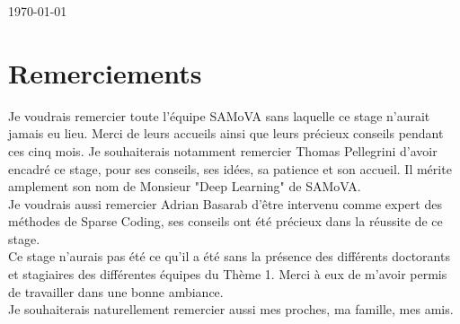 \documentclass[a4paper,10pt]{report}
\begin{document}
\begin{titlepage}
	\vfill %
	
	{\large\today} %
	

	
	\vfill %
	
\end{titlepage}


\chapter*{Remerciements}

Je voudrais remercier toute l'équipe SAMoVA sans laquelle ce stage n'aurait jamais eu lieu. Merci de leurs accueils ainsi que leurs précieux conseils pendant ces cinq mois. Je souhaiterais notamment remercier Thomas Pellegrini d'avoir encadré ce stage, pour ses conseils, ses idées, sa patience et son accueil. Il mérite amplement son nom de Monsieur "Deep Learning" de SAMoVA.\\

Je voudrais aussi remercier Adrian Basarab d'être intervenu comme expert des méthodes de Sparse Coding, ses conseils ont été précieux dans la réussite de ce stage.\\

Ce stage n'aurais pas été ce qu'il a été sans la présence des différents doctorants et stagiaires des différentes équipes du Thème 1. Merci à eux de m'avoir permis de travailler dans une bonne ambiance.\\

Je souhaiterais naturellement remercier aussi mes proches, ma famille, mes amis.\\
\end{document}
